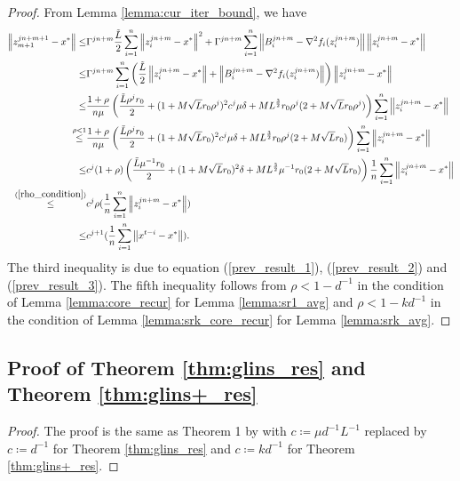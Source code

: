 \documentclass[letterpaper]{article} %
\theoremstyle{plain}
\theoremstyle{definition}
\theoremstyle{remark}
\newcommand\norm[1]{\left\lVert#1\right\rVert}
\begin{document}
\begin{proof}
    From Lemma \ref{lemma:cur_iter_bound}, we have
    \begin{align*}
        \norm{z_{m + 1}^{j n + m + 1} - x^*} \leq &\Gamma^{j n + m} \frac{\Tilde{L}}{2} \sum_{i = 1}^{n} \norm{z_i^{j n + m} - x^*}^2 + \Gamma^{j n + m} \sum_{i=1}^n \norm{B_i^{j n + m} - \nabla^2 f_i (z_i^{j n + m})} \norm{z_i^{j n + m} - x^*} \\
        \leq & \Gamma^{j n + m} \sum_{i = 1}^{n} \left(\frac{\Tilde{L}}{2}  \norm{z_i^{j n + m} - x^*} +  \norm{B_i^{j n + m} - \nabla^2 f_i (z_i^{j n + m})}\right) \norm{z_i^{j n + m} - x^*} \\
        \leq & \frac{1 + \rho}{n \mu}  \left(\frac{\Tilde{L} \rho^j r_0}{2}   + (1 + M \sqrt{L}r_0 \rho^j)^2 c^j \mu \delta + M L^{\frac{3}{2}} r_0 \rho^j (2 + M \sqrt{L} r_0 \rho^j) \right) \sum_{i = 1}^{n} \norm{z_i^{j n + m} - x^*} \\
        \overset{\rho < 1}{\leq} & \frac{1 + \rho}{n \mu}  \left(\frac{\Tilde{L} \rho^j r_0}{2}   + (1 + M \sqrt{L}r_0)^2 c^j \mu \delta + M L^{\frac{3}{2}} r_0 \rho^j (2 + M \sqrt{L} r_0 ) \right) \sum_{i = 1}^{n} \norm{z_i^{j n + m} - x^*} \\
         \leq & c^j (1 + \rho)  \left(\frac{\Tilde{L} \mu^{-1} r_0}{2}   + (1 + M \sqrt{L}r_0)^2  \delta + M L^{\frac{3}{2}} \mu^{-1} r_0  (2 + M \sqrt{L} r_0 ) \right) \frac{1}{n}\sum_{i = 1}^{n} \norm{z_i^{j n + m} - x^*} \\
         \overset{(\ref{rho_condition})}{\leq} & c^{j} \rho (\frac{1}{n} \sum_{i=1}^n \norm{z_i^{j n + m} - x^*}) \\
         \leq & c^{j + 1} (\frac{1}{n} \sum_{i=1}^n \norm{x^{t - i} - x^*}).
    \end{align*}
    The third inequality is due to equation (\ref{prev_result_1}), (\ref{prev_result_2}) and (\ref{prev_result_3}). The fifth inequality follows from $\rho < 1 - d^{-1}$ in the condition of Lemma \ref{lemma:core_recur} for Lemma \ref{lemma:sr1_avg} and $\rho < 1 - k d^{-1}$ in the condition of Lemma \ref{lemma:srk_core_recur} for Lemma \ref{lemma:srk_avg}.
\end{proof}

\subsection{Proof of Theorem \ref{thm:glins_res} and Theorem \ref{thm:glins+_res}}
\begin{proof}
    The proof is the same as Theorem 1 by \cite{lahoti2023sharpened} with $c \coloneqq \mu d^{-1} L^{-1}$ replaced by $c \coloneqq d^{-1}$ for Theorem \ref{thm:glins_res} and $c \coloneqq k d^{-1}$ for Theorem \ref{thm:glins+_res}.
\end{proof}
\end{document}
